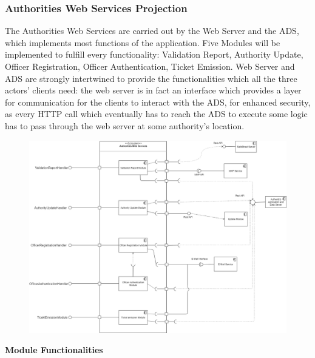\documentclass[12pt,a4paper]{article}
\begin{document}
\subsubsection{Authorities Web Services Projection}
The Authorities Web Services are carried out by the Web Server and the ADS, which implements most functions of the application. Five Modules will be implemented to fulfill every functionality: Validation Report, Authority Update, Officer Registration, Officer Authentication, Ticket Emission. Web Server and ADS are strongly intertwined to provide the functionalities which all the three actors' clients need: the web server is in fact an interface which provides a layer for communication for the clients to interact with the ADS, for enhanced security, as every HTTP call which eventually has to reach the ADS to execute some logic has to pass through the web server at some authority's location.
\begin{figure}[H]
				\centering
					\begin{adjustwidth}{-25mm}{-25mm}
					        \includegraphics[width=0.9\paperwidth]{Images/AuthoritiesServicesProjection}
					\end{adjustwidth}
			\end{figure}
\textbf{Module Functionalities}
\end{document}

